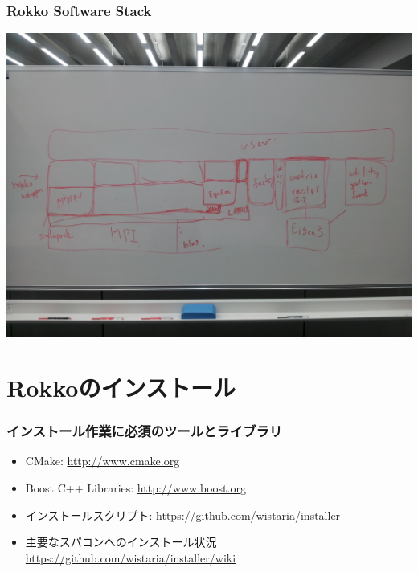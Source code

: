 \begin{frame}
  \frametitle{Rokko Software Stack}
  \begin{center}
    \includegraphics[height=0.8\textheight]{figure/rokko-software-stack.jpg}
  \end{center}
\end{frame}

\section{Rokkoのインストール}

\begin{frame}
  \frametitle{インストール作業に必須のツールとライブラリ}
  \begin{itemize}
    \setlength{\itemsep}{1em}
  \item CMake: \url{http://www.cmake.org}
  \item Boost C++ Libraries: \url{http://www.boost.org}
  \item インストールスクリプト: \url{https://github.com/wistaria/installer}
  \item 主要なスパコンへのインストール状況 \\
    \url{https://github.com/wistaria/installer/wiki}
  \end{itemize}
\end{frame}

